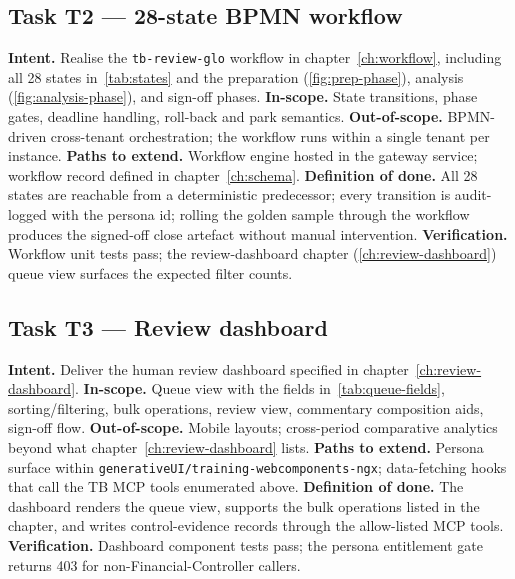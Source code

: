 \subsection*{Task T2 --- 28-state BPMN workflow}
\textbf{Intent.} Realise the \texttt{tb-review-glo} workflow in
chapter~\ref{ch:workflow}, including all 28 states
in~\ref{tab:states} and the preparation
(\ref{fig:prep-phase}), analysis (\ref{fig:analysis-phase}), and
sign-off phases.
\textbf{In-scope.} State transitions, phase gates, deadline handling,
roll-back and park semantics.
\textbf{Out-of-scope.} BPMN-driven cross-tenant orchestration; the
workflow runs within a single tenant per instance.
\textbf{Paths to extend.} Workflow engine hosted in the gateway
service; workflow record defined in chapter~\ref{ch:schema}.
\textbf{Definition of done.} All 28 states are reachable from a
deterministic predecessor; every transition is audit-logged with the
persona id; rolling the golden sample through the workflow produces
the signed-off close artefact without manual intervention.
\textbf{Verification.} Workflow unit tests pass; the review-dashboard
chapter (\ref{ch:review-dashboard}) queue view surfaces the expected
filter counts.

\subsection*{Task T3 --- Review dashboard}
\textbf{Intent.} Deliver the human review dashboard specified in
chapter~\ref{ch:review-dashboard}.
\textbf{In-scope.} Queue view with the fields in~\ref{tab:queue-fields},
sorting/filtering, bulk operations, review view, commentary
composition aids, sign-off flow.
\textbf{Out-of-scope.} Mobile layouts; cross-period comparative
analytics beyond what chapter~\ref{ch:review-dashboard} lists.
\textbf{Paths to extend.} Persona surface within
\texttt{generativeUI/training-webcomponents-ngx}; data-fetching
hooks that call the TB MCP tools enumerated above.
\textbf{Definition of done.} The dashboard renders the queue view,
supports the bulk operations listed in the chapter, and writes
control-evidence records through the allow-listed MCP tools.
\textbf{Verification.} Dashboard component tests pass; the persona
entitlement gate returns 403 for non-Financial-Controller callers.

